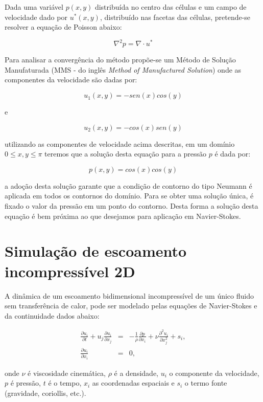 Dada uma variável $p(x,y)$ distribuída no centro das células e um campo de
velocidade dado por $u^*(x,y)$, distribuído nas facetas das células,
pretende-se resolver a equação de Poisson abaixo:

\[
\nabla^2 p = \nabla \cdot u^*
\]

Para analisar a convergência do método propõe-se um Método de Solução
Manufaturada (MMS - do inglês {\it Method of Manufactured Solution}) onde as
componentes da velocidade são dadas por:

\[
u_1(x,y) = - sen(x) cos(y)
\]

\noindent e

\[
u_2(x,y) = - cos(x) sen(y)
\]

\noindent utilizando as componentes de velocidade acima descritas, em um
domínio $0 \le x,y \le \pi$ teremos que a solução desta equação para a pressão
$p$ é dada por:

\[
p(x,y) = cos(x) cos(y)
\]

\noindent a adoção desta solução garante que a condição de contorno do tipo
Neumann é aplicada em todos os contornos do domínio. Para se obter uma solução
única, é fixado o valor da pressão em um ponto do contorno. Desta forma a
solução desta equação é bem próxima ao que desejamos para aplicação em
Navier-Stokes.

\section{Simulação de escoamento incompressível 2D}

A dinâmica de um escoamento bidimensional incompressível de um único fluido sem
transferência de calor, pode ser modelado pelas equações de Navier-Stokes e da
continuidade dados abaixo:

\begin{eqnarray}
\frac{\partial u_i}{\partial t} + u_j \frac{\partial u_i}{\partial x_j} &=&
-\frac{1}{\rho}\frac{\partial p}{\partial x_i} + \nu \frac{\partial^2 u_i}{\partial x_j^2}+s_i,\label{momento}\\
\frac{\partial u_i}{\partial x_i} &=& 0\label{massa},
\end{eqnarray}

\noindent onde $\nu$ é viscosidade cinemática, $\rho$ é a densidade, $u_i$ o
componente da velocidade, $p$ é pressão, $t$ é o tempo, $x_i$ as coordenadas
espaciais e $s_i$ o termo fonte (gravidade, coriollis, etc.).

